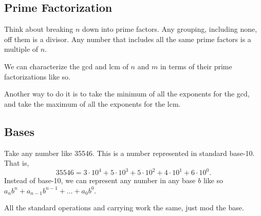 \documentclass[../main.tex]{subfiles}
\begin{document}
\subsection{Prime Factorization}

Think about breaking \( n \) down into prime factors.
Any grouping, including none, off them is a divisor.
Any number that includes all the same prime factors is a multiple of \( n \).

\noindent


We can characterize the gcd and lcm of \( n \) and \( m \)
in terms of their prime factorizations like so.

\noindent


Another way to do it is to take the minimum of all the exponents for the gcd,
and take the maximum of all the exponents for the lcm.

\newpage
\subsection{Bases}

Take any number like 35546.
This is a number represented in standard base-10.
That is,
\[ 35546 = 3 \cdot 10^4 + 5 \cdot 10^3 + 5 \cdot 10^2 + 4 \cdot 10^1 + 6 \cdot 10^0. \]
Instead of base-10, we can represent any number in any base \( b \) like so
\( a_n b^n + a_{n-1} b^{n-1} + \dots + a_0 b^0 \).

All the standard operations and carrying work the same, just mod the base.
\end{document}
